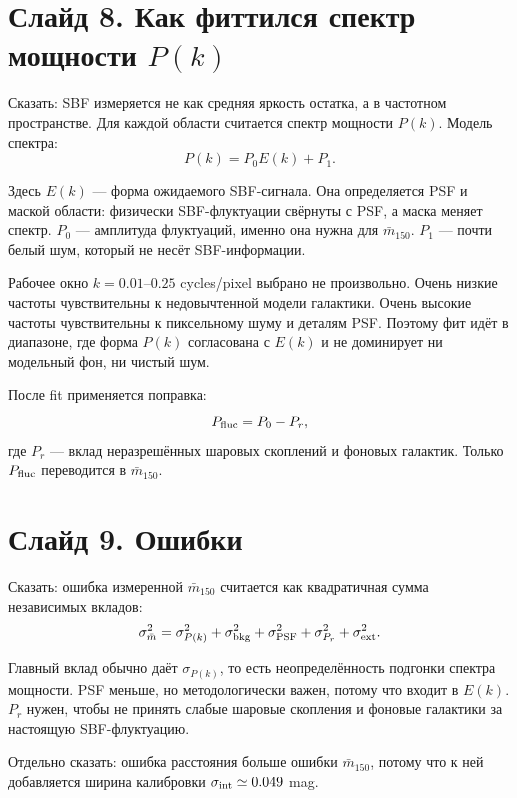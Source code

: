 \documentclass[12pt]{article}
\begin{document}
\section*{Слайд 8. Как фиттился спектр мощности $P(k)$}

Сказать: SBF измеряется не как средняя яркость остатка, а в частотном пространстве. Для каждой области считается спектр мощности $P(k)$. Модель спектра:
\begin{equation*}
    P(k)=P_0E(k)+P_1.
\end{equation*}

Здесь $E(k)$ --- форма ожидаемого SBF-сигнала. Она определяется PSF и маской области: физически SBF-флуктуации свёрнуты с PSF, а маска меняет спектр. $P_0$ --- амплитуда флуктуаций, именно она нужна для $\bar{m}_{150}$. $P_1$ --- почти белый шум, который не несёт SBF-информации.

Рабочее окно $k=0.01$--$0.25$ cycles/pixel выбрано не произвольно. Очень низкие частоты чувствительны к недовычтенной модели галактики. Очень высокие частоты чувствительны к пиксельному шуму и деталям PSF. Поэтому фит идёт в диапазоне, где форма $P(k)$ согласована с $E(k)$ и не доминирует ни модельный фон, ни чистый шум.

После fit применяется поправка:
\begin{equation*}
    P_{\rm fluc}=P_0-P_r,
\end{equation*}
где $P_r$ --- вклад неразрешённых шаровых скоплений и фоновых галактик. Только $P_{\rm fluc}$ переводится в $\bar{m}_{150}$.

\section*{Слайд 9. Ошибки}

Сказать: ошибка измеренной $\bar{m}_{150}$ считается как квадратичная сумма независимых вкладов:
\begin{equation*}
    \sigma_{\bar{m}}^2 =
    \sigma_{P(k)}^2 + \sigma_{\rm bkg}^2 +
    \sigma_{\rm PSF}^2 + \sigma_{P_r}^2 + \sigma_{\rm ext}^2.
\end{equation*}

Главный вклад обычно даёт $\sigma_{P(k)}$, то есть неопределённость подгонки спектра мощности. PSF меньше, но методологически важен, потому что входит в $E(k)$. $P_r$ нужен, чтобы не принять слабые шаровые скопления и фоновые галактики за настоящую SBF-флуктуацию.

Отдельно сказать: ошибка расстояния больше ошибки $\bar{m}_{150}$, потому что к ней добавляется ширина калибровки $\sigma_{\rm int}\simeq0.049$ mag.
\end{document}

